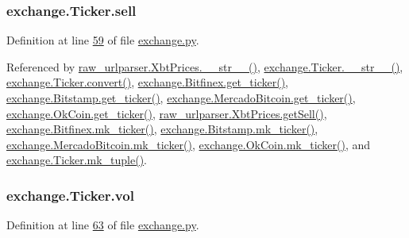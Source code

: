 \subsubsection[{\texorpdfstring{sell}{sell}}]{\setlength{\rightskip}{0pt plus 5cm}exchange.\+Ticker.\+sell}\hypertarget{classexchange_1_1_ticker_a5ba9e257d2ed28f02528a37d9ebd793e}{}\label{classexchange_1_1_ticker_a5ba9e257d2ed28f02528a37d9ebd793e}


Definition at line \hyperlink{exchange_8py_source_l00059}{59} of file \hyperlink{exchange_8py_source}{exchange.\+py}.



Referenced by \hyperlink{raw__urlparser_8py_source_l00074}{raw\+\_\+urlparser.\+Xbt\+Prices.\+\_\+\+\_\+str\+\_\+\+\_\+()}, \hyperlink{exchange_8py_source_l00111}{exchange.\+Ticker.\+\_\+\+\_\+str\+\_\+\+\_\+()}, \hyperlink{exchange_8py_source_l00065}{exchange.\+Ticker.\+convert()}, \hyperlink{exchange_8py_source_l00332}{exchange.\+Bitfinex.\+get\+\_\+ticker()}, \hyperlink{exchange_8py_source_l00401}{exchange.\+Bitstamp.\+get\+\_\+ticker()}, \hyperlink{exchange_8py_source_l00535}{exchange.\+Mercado\+Bitcoin.\+get\+\_\+ticker()}, \hyperlink{exchange_8py_source_l00600}{exchange.\+Ok\+Coin.\+get\+\_\+ticker()}, \hyperlink{raw__urlparser_8py_source_l00065}{raw\+\_\+urlparser.\+Xbt\+Prices.\+get\+Sell()}, \hyperlink{exchange_8py_source_l00346}{exchange.\+Bitfinex.\+mk\+\_\+ticker()}, \hyperlink{exchange_8py_source_l00415}{exchange.\+Bitstamp.\+mk\+\_\+ticker()}, \hyperlink{exchange_8py_source_l00549}{exchange.\+Mercado\+Bitcoin.\+mk\+\_\+ticker()}, \hyperlink{exchange_8py_source_l00614}{exchange.\+Ok\+Coin.\+mk\+\_\+ticker()}, and \hyperlink{exchange_8py_source_l00096}{exchange.\+Ticker.\+mk\+\_\+tuple()}.

\subsubsection[{\texorpdfstring{vol}{vol}}]{\setlength{\rightskip}{0pt plus 5cm}exchange.\+Ticker.\+vol}\hypertarget{classexchange_1_1_ticker_a24c0dd396aebc54c06e429a68c964ea3}{}\label{classexchange_1_1_ticker_a24c0dd396aebc54c06e429a68c964ea3}


Definition at line \hyperlink{exchange_8py_source_l00063}{63} of file \hyperlink{exchange_8py_source}{exchange.\+py}.




